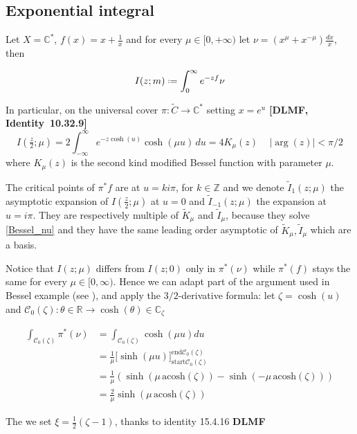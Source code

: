 \documentclass{article}
\newcommand{\Z}{\mathbb{Z}}
\newcommand{\R}{\mathbb{R}}
\newcommand{\C}{\mathbb{C}}
\begin{document}
\subsection{Exponential integral}

Let $X=\C^*$, $f(x)=x+\frac{1}{x}$ and for every $\mu\in [0,+\infty)$ let $\nu=\left(x^\mu+x^{-\mu}\right) \tfrac{dx}{x}$, then  

\begin{equation}
I(z;m)\defeq\int_{0}^{\infty}e^{-zf}\nu
\end{equation}

In particular, on the universal cover $\pi\colon\tilde{C}\to \C^*$ setting $x=e^u$ \textbf{[DLMF, Identity~10.32.9]}
\begin{equation}
I(\tfrac{z}{2};\mu)=2\int_{-\infty}^{\infty}e^{-z\cosh(u)}\cosh(\mu u)\,du=4K_\mu(z)\,\quad |\arg(z)|<\pi/2
\end{equation} 
where $K_\mu(z)$ is the second kind modified Bessel function with parameter $\mu$. 

The critical points of $\pi^* f$ are at $u=k i \pi$, for $k\in\Z$ and we denote $\tilde{I}_{1}(z;\mu)$ the asymptotic expansion of $I(\tfrac{z}{2};\mu)$ at $u=0$ and $\tilde{I}_{-1}(z;\mu)$ the expansion at $u=i \pi$. They are respectively multiple of $\tilde{K}_{\mu}$ and $\tilde{I}_{\mu}$, because they solve \eqref{Bessel_nu} and they have the same leading order asymptotic of $\tilde{K}_{\mu}, \tilde{I}_{\mu}$ which are a basis.  

Notice that $I(z;\mu)$ differs from $I(z;0)$ only in $\pi^*(\nu)$ while $\pi^*(f)$ stays the same for every $\mu\in [0,\infty)$. Hence we can adapt part of the argument used in Bessel example (see ), and apply the $3/2$-derivative formula: let $\zeta=\cosh(u)$ and $\mathcal{C}_0(\zeta)\colon\theta\in\R\to\cosh(\theta)\in\C_\zeta$

\begin{align*}
\int_{\mathcal{C}_0(\zeta)}\pi^*(\nu)&=\int_{\mathcal{C}_0(\zeta)}\cosh(\mu u)du\\
&=\frac{1}{\mu}\Big[\sinh(\mu u)\Big]_{\mathrm{start}\mathcal{C}_0(\zeta)}^{\mathrm{end}\mathcal{C}_0(\zeta)}\\
&=\frac{1}{\mu}\left(\sinh\left(\mu\,\mathrm{acosh}\left(\zeta\right)\right)-\sinh\left(-\mu\,\mathrm{acosh}\left(\zeta\right)\right)\right)\\
&=\frac{2}{\mu}\sinh\left(\mu\,\mathrm{acosh}\left(\zeta\right)\right)
\end{align*}


The we set $\xi=\frac{1}{2}\left(\zeta-1\right)$, thanks to identity 15.4.16 \textbf{DLMF}
\end{document}
